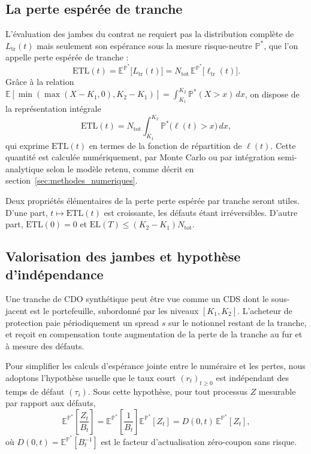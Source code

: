 \subsection{La perte espérée de tranche}

L'évaluation des jambes du contrat ne requiert pas la distribution complète de
$L_{\text{tr}}(t)$ mais seulement son espérance sous la mesure risque-neutre $\mathbb{P}^*$,
que l'on appelle perte espérée de tranche :
\begin{equation}
    \text{ETL}(t) = \mathbb{E}^{\mathbb{P}^*}\!\bigl[L_{\text{tr}}(t)\bigr]
    = N_{\text{tot}}\,\mathbb{E}^{\mathbb{P}^*}\!\bigl[\ell_{\text{tr}}(t)\bigr].
    \label{eq:etl}
\end{equation}
Grâce à la relation $\mathbb{E}[\min(\max(X - K_1, 0), K_2-K_1)] = \int_{K_1}^{K_2}\mathbb{P}^*(X > x)\,dx$,
on dispose de la représentation intégrale
\begin{equation}
    \text{ETL}(t) = N_{\text{tot}} \int_{K_1}^{K_2} \mathbb{P}^*\!\bigl(\ell(t) > x\bigr)\, dx,
    \label{eq:etl_integrale}
\end{equation}
qui exprime $\text{ETL}(t)$ en termes de la fonction de répartition de $\ell(t)$.
Cette quantité est calculée numériquement, par Monte Carlo ou par intégration semi-analytique
selon le modèle retenu, comme décrit en section~\ref{sec:methodes_numeriques}.

Deux propriétés élémentaires de la perte perte espérée par tranche seront utiles. D'une part, $t \mapsto \text{ETL}(t)$
est croissante, les défauts étant irréversibles. D'autre part, $\text{ETL}(0) = 0$ et
$\text{EL}(T) \leq (K_2 - K_1) N_{\text{tot}}$.

\subsection{Valorisation des jambes et hypothèse d'indépendance}

Une tranche de CDO synthétique peut être vue comme un CDS dont le sous-jacent est le
portefeuille, subordonné par les niveaux $[K_1, K_2]$. L'acheteur de protection paie
périodiquement un spread $s$ sur le notionnel restant de la tranche, et reçoit en compensation
toute augmentation de la perte de la tranche au fur et à mesure des défauts.

Pour simplifier les calculs d'espérance jointe entre le numéraire et les pertes, nous
adoptons l'hypothèse usuelle que le taux court $(r_t)_{t \geq 0}$ est indépendant des
temps de défaut $(\tau_i)$. Sous cette hypothèse, pour tout processus $Z$ mesurable par
rapport aux défauts,
\begin{equation}
    \mathbb{E}^{\mathbb{P}^*}\!\left[\frac{Z_t}{B_t}\right]
    = \mathbb{E}^{\mathbb{P}^*}\!\left[\frac{1}{B_t}\right] \mathbb{E}^{\mathbb{P}^*}[Z_t]
    = D(0, t)\,\mathbb{E}^{\mathbb{P}^*}[Z_t],
    \label{eq:independance}
\end{equation}
où $D(0, t) = \mathbb{E}^{\mathbb{P}^*}[B_t^{-1}]$ est le facteur d'actualisation zéro-coupon
sans risque.

